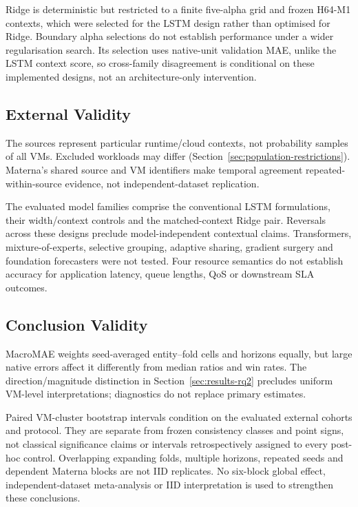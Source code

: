 \documentclass[a4paper,fleqn]{cas-dc}
\begin{document}
Ridge is deterministic but restricted to a finite five-alpha grid and frozen
H64-M1 contexts, which were selected for the LSTM design rather than optimised
for Ridge. Boundary alpha selections do not establish performance under a
wider regularisation search. Its selection uses native-unit validation MAE,
unlike the LSTM context score, so cross-family disagreement is conditional on
these implemented designs, not an architecture-only intervention.

\subsection{External Validity}
\label{sec:threats-external}

The sources represent particular runtime/cloud contexts, not probability
samples of all VMs. Excluded workloads may differ
(Section~\ref{sec:population-restrictions}). Materna's shared source and VM
identifiers make temporal agreement repeated-within-source evidence, not
independent-dataset replication.

The evaluated model families comprise the conventional LSTM formulations,
their width/context controls and the matched-context Ridge pair. Reversals
across these designs preclude model-independent contextual claims.
Transformers, mixture-of-experts, selective grouping, adaptive sharing,
gradient surgery and foundation forecasters were not tested. Four resource
semantics do not establish accuracy for application latency, queue lengths,
QoS or downstream SLA outcomes.

\subsection{Conclusion Validity}
\label{sec:threats-conclusion}

MacroMAE weights seed-averaged entity--fold cells and horizons equally, but
large native errors affect it differently from median ratios and win rates.
The direction/magnitude distinction in Section~\ref{sec:results-rq2} precludes
uniform VM-level interpretations; diagnostics do not replace primary estimates.

Paired VM-cluster bootstrap intervals condition on the evaluated external
cohorts and protocol. They are separate from frozen consistency classes and
point signs, not classical significance claims or intervals retrospectively
assigned to every post-hoc control. Overlapping expanding folds, multiple
horizons, repeated seeds and dependent Materna blocks are not IID replicates.
No six-block global effect, independent-dataset meta-analysis or IID
interpretation is used to strengthen these conclusions.
\end{document}
